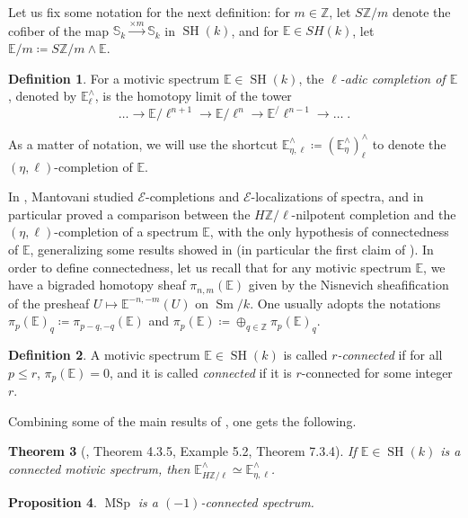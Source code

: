 \documentclass[10pt]{amsart}
\theoremstyle{definition}
\newtheorem{defn}{Definition}[section]
\theoremstyle{plain}
\newtheorem{thm}[defn]{Theorem}
\newtheorem{prop}[defn]{Proposition}
\numberwithin{equation}{section}
\newcommand{\0}{\emptyset}
\newcommand{\sE}{{\mathcal E}}
\newcommand{\E}{{\mathbb E}}
\newcommand{\Z}{{\mathbb Z}}
\newcommand{\MSp}{{\operatorname{MSp}}}
\newcommand{\SH}{{\operatorname{SH}}}
\newcommand{\Sm}{{\operatorname{Sm}}}
\begin{document}
Let us fix some notation for the next definition: for $m \in \Z$, let $S\Z/m$ denote the cofiber of the map $\mathbb{S}_k \xrightarrow{\times m} \mathbb{S}_k$ in $\SH(k)$, and for $\E \in SH(k)$, let $\E/m \coloneqq S\Z/m \wedge \E$.  

\begin{defn}
\label{defn:ellCompl}
    For a motivic spectrum $\E \in \SH(k)$, the \emph{$\ell$-adic completion of $\E$}, denoted by $\E_\ell^\wedge$, is the homotopy limit of the tower
    $$\ldots \to \E/\ell^{n+1} \to \E/\ell^n \to \E^/\ell^{n-1} \to \ldots \; .$$
\end{defn}

As a matter of notation, we will use the shortcut $\E^\wedge_{\eta,\ell} \coloneqq (\E_\eta^\wedge)_\ell^\wedge$ to denote the $(\eta, \ell)$-completion of $\E$.

In \cite{Man:completions}, Mantovani studied $\sE$-completions and $\sE$-localizations of spectra, and in particular proved a comparison between the $H\Z/\ell$-nilpotent completion and the $(\eta,\ell)$-completion of a spectrum $\E$, with the only hypothesis of connectedness of $\E$, generalizing some results showed in \cite{ormsby:adams} (in particular the first claim of \cite[Theorem 1]{ormsby:adams}). In order to define connectedness, let us recall that for any motivic spectrum $\E$, we have a bigraded homotopy sheaf $\pi_{n,m}(\E)$ given by the Nisnevich sheafification of the presheaf $U \mapsto \E^{-n,-m}(U)$ on $\Sm/k$. One usually adopts the notations $\pi_p(\E)_q \coloneqq \pi_{p-q,-q}(\E)$ and $\pi_p(\E) \coloneqq \oplus_{q \in \Z} \pi_p(\E)_q$. 

\begin{defn}
    A motivic spectrum $\E \in \SH(k)$ is called \emph{$r$-connected} if for all $p \le r$, $\pi_p(\E)=0$, and it is called \emph{connected} if it is $r$-connected for some integer $r$.
\end{defn}

Combining some of the main results of \cite{Man:completions}, one gets the following.

\begin{thm}[\cite{Man:completions}, Theorem 4.3.5, Example 5.2, Theorem 7.3.4]
\label{thm:Mantovani}
    If $\E \in \SH(k)$ is a connected motivic spectrum, then $\E_{H\Z/\ell}^\wedge \simeq \E_{\eta, \ell}^\wedge$.
\end{thm}

\begin{prop}
\label{prop:mspconnective}
    $\MSp$ is a $(-1)$-connected spectrum.
\end{prop}
\end{document}
